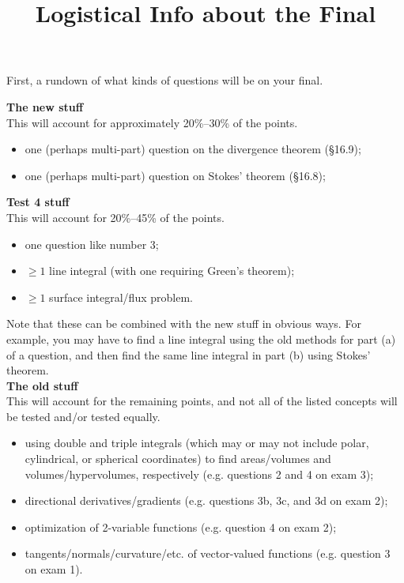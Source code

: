 \documentclass[12pt]{article}
\title{\vspace{-0.75in}\LARGE{Logistical Info about the Final}\vspace{-1in}}
\date{}
\begin{document}
	\setlength\parskip{4.5mm}
	
	\maketitle
	
	\noindent First, a rundown of what kinds of questions will be on your final.
	
	\begin{adjustwidth}{0.25in}{0.25in}
		\noindent \textbf{The new stuff}\\[1.5mm]
		\noindent This will account for approximately 20\%--30\% of the points.
		\begin{itemize}[topsep=1.5mm,parsep=-4.5mm,itemsep=6mm]
			\item one (perhaps multi-part) question on the divergence theorem (\S 16.9);
			\item one (perhaps multi-part) question on Stokes' theorem (\S 16.8);
		\end{itemize}
	
		\noindent\textbf{Test 4 stuff}\\[1.5mm]
		This will account for 20\%--45\% of the points.
		\begin{itemize}[topsep=1.5mm,parsep=-4.5mm,itemsep=6mm]
			\item one question like number 3;
			\item $\geq 1$ line integral (with one requiring Green's theorem);
			\item $\geq 1$ surface integral/flux problem.
		\end{itemize}\vspace{-4.5mm}
		\noindent Note that these can be combined with the new stuff in obvious ways. For example, you may have to find a line integral using the old methods for part (a) of a question, and then find the same line integral in part (b) using Stokes' theorem.\\[-4.5mm]
	
		\noindent\textbf{The old stuff}\\[1.5mm]
		This will account for the remaining points, and not all of the listed concepts will be tested and/or tested equally.
		\begin{itemize}[topsep=1.5mm,parsep=-4.5mm,itemsep=6mm]
			\item using double and triple integrals (which may or may not include polar, cylindrical, or spherical coordinates) to find areas/volumes and volumes/hypervolumes, respectively (e.g. questions 2 and 4 on exam 3);
			\item directional derivatives/gradients (e.g. questions 3b, 3c, and 3d on exam 2);
			\item optimization of 2-variable functions (e.g. question 4 on exam 2);
			\item tangents/normals/curvature/etc. of vector-valued functions (e.g. question 3 on exam 1).
		\end{itemize}
	\end{adjustwidth}
	
\end{document}
